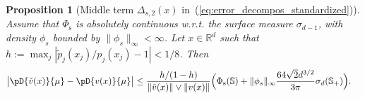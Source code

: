 \documentclass{article}
\numberwithin{equation}{section}
\newtheorem{proposition}{Proposition}[section]
\newcommand{\rset}{\mathbb{R}}
\newcommand{\sphere}{\mathbb{S}}
\newcommand{\mus}{\mu}%
\newcommand{\Phitrad}{\Phi_{\mathrm{s}}} %
\begin{document}
\begin{proposition}[Middle term $\Delta_{s,2}(x)$ in~(\ref{eq:error_decompos_standardized})]\label{prop:control_error_polardepths_from_tildev}
Assume that $\Phitrad$ is absolutely continuous w.r.t. the surface measure $\sigma_{d-1}$, with density $\phi_s$ bounded by $\|\phi_s\|_\infty<\infty$.    Let $x\in\rset^d$ such that 
$h := \max_j|\tilde p_j(x_j)/p_j(x_j) - 1 | <  1/8$. %
Then
\begin{align*}
\big| \pD{\tilde v(x)}{\mus} - \pD{ v(x)}{\mus} \big|
    &\le \frac{h/(1-h)}{\|\tilde v(x)\| \vee  \| v(x)\| }
    \Big( \Phitrad(\sphere)  + 
    \|\phi_s\|_\infty\frac{64\sqrt{2} d^{3/2}}{3\pi}\sigma_{d}(\sphere_+)
    \Big).
    \end{align*}
\end{proposition}

\bigskip 
\end{document}
